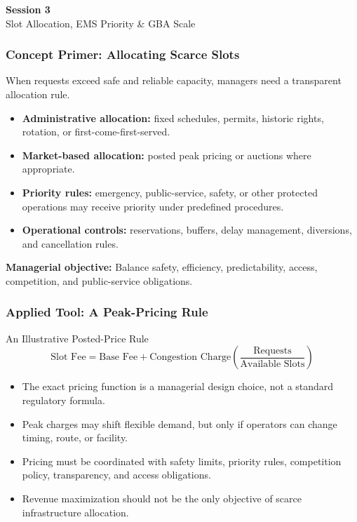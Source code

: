 \documentclass{beamer}
\begin{document}
\begin{frame}[c]
  \begin{center}
    \huge\color{cuhkpurple}\textbf{Session 3}\\
    \vspace{0.5cm}
    \Large Slot Allocation, EMS Priority \& GBA Scale
  \end{center}
\end{frame}

\begin{frame}[t]
\frametitle{Concept Primer: Allocating Scarce Slots}
When requests exceed safe and reliable capacity, managers need a transparent allocation rule.
\begin{itemize}
\item \textbf{Administrative allocation:} fixed schedules, permits, historic rights, rotation, or first-come-first-served.
\item \textbf{Market-based allocation:} posted peak pricing or auctions where appropriate.
\item \textbf{Priority rules:} emergency, public-service, safety, or other protected operations may receive priority under predefined procedures.
\item \textbf{Operational controls:} reservations, buffers, delay management, diversions, and cancellation rules.
\end{itemize}
\textbf{Managerial objective:} Balance safety, efficiency, predictability, access, competition, and public-service obligations.
\end{frame}

\begin{frame}[t]
\frametitle{Applied Tool: A Peak-Pricing Rule}
\begin{block}{An Illustrative Posted-Price Rule}
\[
\text{Slot Fee}
=
\text{Base Fee}
+
\text{Congestion Charge}\left(\frac{\text{Requests}}{\text{Available Slots}}\right)
\]
\end{block}
\begin{itemize}
\item The exact pricing function is a managerial design choice, not a standard regulatory formula.
\item Peak charges may shift flexible demand, but only if operators can change timing, route, or facility.
\item Pricing must be coordinated with safety limits, priority rules, competition policy, transparency, and access obligations.
\item Revenue maximization should not be the only objective of scarce infrastructure allocation.
\end{itemize}
\end{frame}
\end{document}
